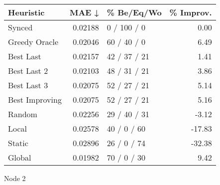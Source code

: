 \begin{tabular}{lrlr}
\toprule
\textbf{Heuristic} & \textbf{MAE ↓} & \textbf{\% Be/Eq/Wo} & \textbf{\% Improv.} \\
\midrule
            Synced &        0.02188 &          0 / 100 / 0 &                0.00 \\
     Greedy Oracle &        0.02046 &          60 / 40 / 0 &                6.49 \\
         Best Last &        0.02157 &         42 / 37 / 21 &                1.41 \\
       Best Last 2 &        0.02103 &         48 / 31 / 21 &                3.86 \\
       Best Last 3 &        0.02075 &         52 / 27 / 21 &                5.14 \\
    Best Improving &        0.02075 &         52 / 27 / 21 &                5.16 \\
            Random &        0.02256 &         29 / 40 / 31 &               -3.12 \\
             Local &        0.02578 &          40 / 0 / 60 &              -17.83 \\
            Static &        0.02896 &          26 / 0 / 74 &              -32.38 \\
            Global &        0.01982 &          70 / 0 / 30 &                9.42 \\
\bottomrule
\end{tabular}
\caption{Node 2}
\label{tab:non_lr05_le2_bs2_2}
